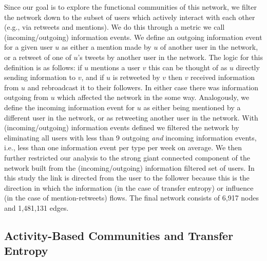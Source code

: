 Since our goal is to explore the functional communities of this network, we filter the network down to the subset of users which actively interact with each other (e.g., via retweets and mentions). We do this through a metric we call (incoming/outgoing) information events. We define an outgoing information event for a given user $u$ as either a mention made by $u$ of another user in the network, or a retweet of one of $u$'s tweets by another user in the network. The logic for this definition is as follows: if $u$ mentions a user $v$ this can be thought of as $u$ directly sending information to $v$, and if $u$ is retweeted by $v$ then $v$ received information from $u$ and rebroadcast it to their followers. In either case there was information outgoing from $u$ which affected the network in the some way. Analogously, we define the incoming information event for $u$ as either being mentioned by a different user in the network, or as retweeting another user in the network.
With (incoming/outgoing) information events defined we filtered the network by eliminating all users with less than 9 outgoing \emph{and} incoming information events, i.e., less than one information event per type per week on average. 
We then further restricted our analysis to the strong giant connected component of the network built from the (incoming/outgoing) information filtered set of users. %
In this study the link is directed from the user to the follower because this is the direction in which the information (in the case of transfer entropy) or influence (in the case of mention-retweets) flows. The final network consists of 6,917 nodes and 1,481,131 edges.

\subsection{Activity-Based Communities and Transfer Entropy}
\label{sec:method-activity}

